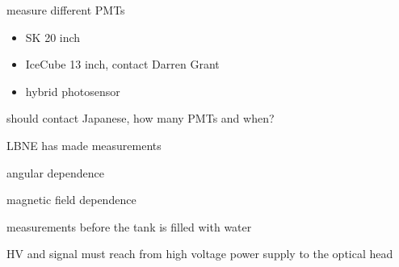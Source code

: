 measure different PMTs
\begin{itemize}
\item SK 20 inch
\item IceCube 13 inch, contact Darren Grant
\item hybrid photosensor
\end{itemize}

should contact Japanese, how many PMTs and when?

LBNE has made measurements

angular dependence

magnetic field dependence


measurements before the tank is filled with water

HV and signal must reach from high voltage power supply to the optical
head


